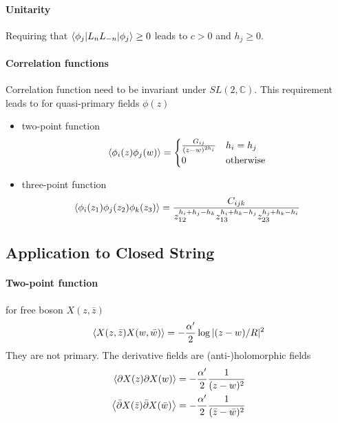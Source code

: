 \documentclass[12pt, a4paper, DIV=15]{article}
\numberwithin{equation}{section}
\begin{document}
\paragraph{Unitarity}
Requiring that $\expval{\phi_j | L_n L_{-n} | \phi_j} \geq 0$  leads to $c>0$ and $h_j \geq 0$.

\paragraph{Correlation functions}
Correlation function need to be invariant under $SL(2, \mathbb{C})$. This requirement leads to for quasi-primary fields $\phi (z)$
\begin{itemize}
	\item two-point function
		\begin{equation}
			\expval{\phi_i(z) \phi_j(w)} = 
			\begin{cases}
				\frac{G_{ij}}{(z-w)^{2h_i}} & h_i = h_j \\
				0 & \text{otherwise}	
			\end{cases}
		\end{equation}
	\item three-point function
		\begin{equation}
			\expval{\phi_i(z_1) \phi_j(z_2) \phi_k(z_3)} = \frac{C_{ijk}}{z_{12}^{h_i+h_j-h_k} z_{13}^{h_i+h_k-h_j} z_{23}^{h_j+h_k-h_i}}
		\end{equation}
\end{itemize}

\subsection{Application to Closed String}
\paragraph{Two-point function}
for free boson $X(z,\bar{z})$
\begin{equation}
	\braket{X(z,\bar{z}) X(w,\bar{w}) } = - \frac{\alpha'}{2} \log|(z-w)/R|^2
\end{equation}
They are not primary. The derivative fields are (anti-)holomorphic fields
\begin{subequations}
\begin{align}
	\expval{\partial X(z) \partial X(w)} &= - \frac{\alpha'}{2} \frac{1}{(z-w)^2} \\
	\expval{\bar{\partial} X(\bar{z}) \bar{\partial} X(\bar{w})} &= -\frac{\alpha'}{2} \frac{1}{(\bar{z} - \bar{w})^2}
\end{align}
\end{subequations}
\end{document}

